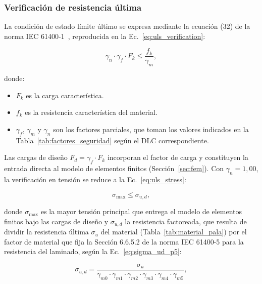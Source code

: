 \subsubsection{Verificación de resistencia última}

La condición de estado límite último se expresa mediante la ecuación (32) de la norma IEC 61400-1~\parencite*{IEC61400-1}, reproducida en la Ec.~\ref{eq:uls_verification}:

\begin{equation}
    \gamma_n \cdot \gamma_f \cdot F_k \leq \frac{f_k}{\gamma_m},
    \label{eq:uls_verification}
\end{equation}

donde:
\begin{itemize}
    \item $F_k$ es la carga característica.
    \item $f_k$ es la resistencia característica del material.
    \item $\gamma_f$, $\gamma_m$ y $\gamma_n$ son los factores parciales, que toman los valores indicados en la Tabla~\ref{tab:factores_seguridad} según el DLC correspondiente.
\end{itemize}

Las cargas de diseño $F_d = \gamma_f \cdot F_k$ incorporan el factor de carga y constituyen la entrada directa al modelo de elementos finitos (Sección~\ref{sec:fem}). Con $\gamma_n = 1{,}00$, la verificación en tensión se reduce a la Ec.~\ref{eq:uls_stress}:

\begin{equation}
    \sigma_{\max} \leq \sigma_{u,d},
    \label{eq:uls_stress}
\end{equation}

donde $\sigma_{\max}$ es la mayor tensión principal que entrega el modelo de elementos finitos bajo las cargas de diseño y $\sigma_{u,d}$ la resistencia factoreada, que resulta de dividir la resistencia última $\sigma_u$ del material (Tabla~\ref{tab:material_pala}) por el factor de material que fija la Sección 6.6.5.2 de la norma IEC 61400-5 para la resistencia del laminado, según la Ec.~\ref{eq:sigma_ud_p5}:

\begin{equation}
    \sigma_{u,d} = \frac{\sigma_u}{\gamma_{m0} \cdot \gamma_{m1} \cdot \gamma_{m2} \cdot \gamma_{m3} \cdot \gamma_{m4} \cdot \gamma_{m5}},
    \label{eq:sigma_ud_p5}
\end{equation}

